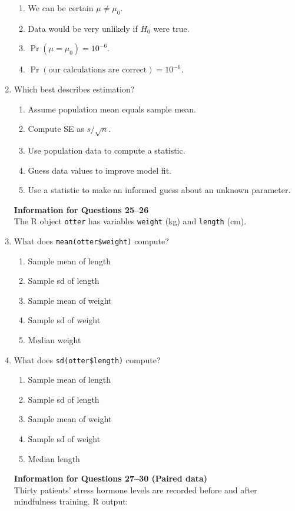 \documentclass{article}
\begin{document}
\begin{enumerate}
\begin{enumerate}[label=\Alph*.]
        \item We can be certain $\mu\neq\mu_0$.
        \item Data would be very unlikely if $H_0$ were true.
        \item $\Pr(\mu=\mu_0)=10^{-6}$.
        \item $\Pr(\text{our calculations are correct})=10^{-6}$.
    \end{enumerate}
\item Which best describes estimation?
    \begin{enumerate}[label=\Alph*.]
        \item Assume population mean equals sample mean.
        \item Compute SE as $s/\sqrt n$.
        \item Use population data to compute a statistic.
        \item Guess data values to improve model fit.
        \item Use a statistic to make an informed guess about an unknown parameter.
    \end{enumerate}

\textbf{Information for Questions 25--26}\\
The R object \texttt{otter} has variables \texttt{weight} (kg) and \texttt{length} (cm).
\item What does \texttt{mean(otter\$weight)} compute?
    \begin{enumerate}[label=\Alph*.]
        \item Sample mean of length
        \item Sample sd of length
        \item Sample mean of weight
        \item Sample sd of weight
        \item Median weight
    \end{enumerate}
\item What does \texttt{sd(otter\$length)} compute?
    \begin{enumerate}[label=\Alph*.]
        \item Sample mean of length
        \item Sample sd of length
        \item Sample mean of weight
        \item Sample sd of weight
        \item Median length
    \end{enumerate}

\textbf{Information for Questions 27--30 (Paired data)}\\
Thirty patients’ stress hormone levels are recorded before and after mindfulness training. R output:


\end{enumerate}
\end{document}
